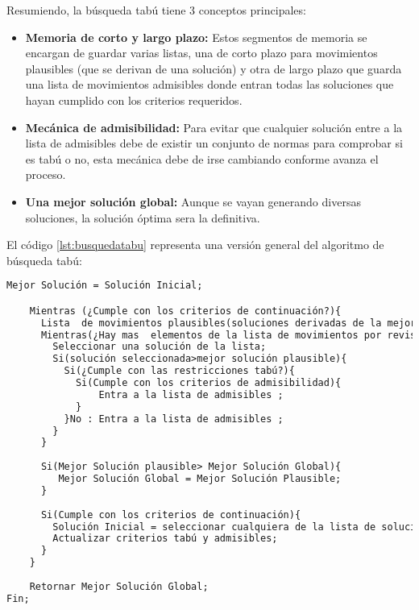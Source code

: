Resumiendo, la búsqueda tabú tiene 3 conceptos principales:

\begin{itemize}
\item \textbf{Memoria de corto y largo plazo: } Estos segmentos de memoria se encargan de guardar varias listas, una de corto plazo para movimientos plausibles (que se derivan de una solución) y otra de largo plazo que guarda una lista de movimientos admisibles donde entran todas las soluciones que hayan cumplido con los criterios requeridos.
\item \textbf {Mecánica de admisibilidad: } Para evitar que cualquier solución entre a la lista de admisibles debe de existir un conjunto de normas para comprobar si es tabú o no, esta mecánica debe de irse cambiando conforme avanza el proceso.
\item \textbf {Una mejor solución global: } Aunque se vayan generando diversas soluciones, la solución óptima sera la definitiva.
\end{itemize}

\hspace*{1cm}El código \ref{lst:busquedatabu} representa una versión general del algoritmo de búsqueda tabú:\\

\begin{lstlisting}[language=HTML, caption=Búsqueda tabú, label=lst:busquedatabu]
Mejor Solución = Solución Inicial;

    Mientras (¿Cumple con los criterios de continuación?){
      Lista  de movimientos plausibles(soluciones derivadas de la mejor solución)
      Mientras(¿Hay mas  elementos de la lista de movimientos por revisar?){
    	Seleccionar una solución de la lista;
    	Si(solución seleccionada>mejor solución plausible){
     	  Si(¿Cumple con las restricciones tabú?){
    		Si(Cumple con los criterios de admisibilidad){
    			Entra a la lista de admisibles ;
    		}
    	  }No : Entra a la lista de admisibles ; 
    	}
      }
    
      Si(Mejor Solución plausible> Mejor Solución Global){
         Mejor Solución Global = Mejor Solución Plausible;
      }
    
      Si(Cumple con los criterios de continuación){
    	Solución Inicial = seleccionar cualquiera de la lista de soluciones admisibles;
    	Actualizar criterios tabú y admisibles;
      }
    }
    
    Retornar Mejor Solución Global;
Fin;
\end{lstlisting}